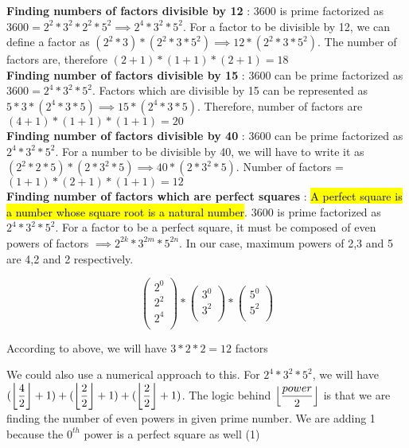 \textbf{Finding numbers of factors divisible by 12} : 3600 is prime factorized as $3600 = 2^2 * 3^2 * 2^2 * 5^2 \implies 2^4 * 3^2 * 5^2$. For a factor to be divisible by 12, we can define a factor as $(2^2 * 3) * (2^2 * 3 * 5^2) \implies 12 * (2^2 * 3 * 5^2)$. The number of factors are, therefore $(2+1) * (1+1) * (2+1) = 18$ \\

\textbf{Finding number of factors divisible by 15} : 3600 can be prime factorized as $3600 = 2^4 * 3^2 * 5^2$. Factors which are divisible by 15 can be represented as $5 * 3 * (2^4 * 3 * 5) \implies 15 * (2^4 * 3 * 5)$. Therefore, number of factors are $(4+1) * (1+1) * (1+1) = 20$ \\

\textbf{Finding number of factors divisible by 40} : 3600 can be prime factorized as $2^4 * 3^2 * 5^2$. For a number to be divisible by 40, we will have to write it as $(2^2 * 2 * 5) * (2 * 3^2 * 5) \implies 40 * (2 * 3^2 * 5)$. Number of factors = $(1+1) * (2+1) * (1+1) = 12$ \\

\textbf{Finding number of factors which are perfect squares} : \hl{A perfect square is a number whose square root is a natural number}. 3600 is prime factorized as $2^4 * 3^2 * 5^2$. For a factor to be a perfect square, it must be composed of even powers of factors $\implies 2^{2k} * 3^{2m} * 5^{2n}$. In our case, maximum powers of 2,3 and 5 are 4,2 and 2 respectively. 

$$
\begin{pmatrix}
    2^0 \\
    2^2 \\
    2^4 \\
\end{pmatrix}
*
\begin{pmatrix}
    3^0 \\
    3^2 \\
\end{pmatrix}
*
\begin{pmatrix}
    5^0 \\
    5^2 \\
\end{pmatrix}
$$

According to above, we will have $3 * 2 * 2 = 12$ factors

\begin{NOTE}
    We could also use a numerical approach to this. For $2^4 * 3^2 * 5^2$, we will have $(\displaystyle{\left \lfloor { \dfrac{4}{2} } \right \rfloor} + 1) + (\displaystyle{\left \lfloor { \dfrac{2}{2} } \right \rfloor} + 1) + (\displaystyle{\left \lfloor { \dfrac{2}{2} } \right \rfloor} + 1)$. The logic behind $\displaystyle{\left \lfloor { \dfrac{power}{2} } \right \rfloor}$ is that we are finding the number of even powers in given prime number. We are adding 1 because the $0^{th}$ power is a perfect square as well (1)
\end{NOTE}

